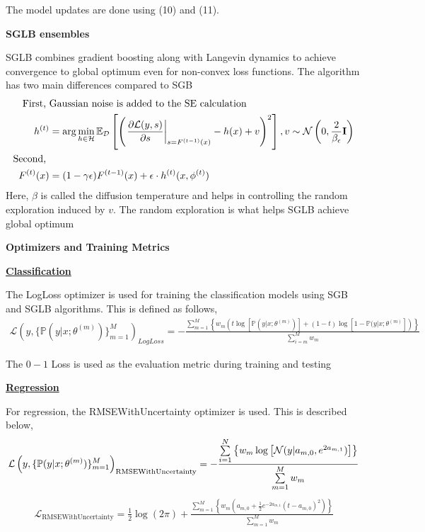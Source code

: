 \documentclass{article}
\begin{document}
The model updates are done using (10) and (11).

\textbf{SGLB ensembles}

SGLB combines gradient boosting along with Langevin dynamics \citet{raginsky} to achieve convergence to global optimum even for non-convex loss functions. The algorithm has two main differences compared to SGB \cite{sglb}
\begin{align}
	\text{First, } &\text{Gaussian noise is added to the SE calculation} \notag \\
	h^{(t)} &= \arg \min_{h \in \mathcal{H}} \mathbb{E}_{\mathcal{D}} \left[ \left( \left. \frac{\partial{\mathcal{L}(y,s)}}{\partial{s}} \right|_{s = F^{(t-1)}(x)} - h(x) + v \right)^2 \right], v \sim \mathcal{N}\left( 0, \frac{2}{\beta_{\epsilon}} \textbf{I}\right) \\
	\text{Second, } & \notag \\
	F^{(t)}(x) &= (1-\gamma\epsilon)F^{(t-1)}(x) + \epsilon \cdot h^{(t)}(x, \phi^{(t)})
\end{align}
Here, $\beta$ is called the diffusion temperature and helps in controlling the random exploration induced by $v$. The random exploration is what helps SGLB achieve global optimum

\textbf{Optimizers and Training Metrics}

\textbf{\underline{Classification}}

The LogLoss optimizer is used for training the classification models using SGB and SGLB algorithms. This is defined as follows,
\begin{align}
	\mathcal{L}\left(y,\{ \mathbb{P}(y|x; \theta^{(m)}) \}_{m=1}^M \right)_{LogLoss} = - \frac{\sum\limits_{m=1}^M \left\{ w_m\left(t\log\left[\mathbb{P}(y|x; \theta^{(m)})\right] + (1-t)\log\left[ 1 - \mathbb{P}(y|x; \theta^{(m)}\right]\right) \right\}}{\sum\limits_{i=m}^M w_m}
\end{align}

The $0-1$ Loss is used as the evaluation metric during training and testing

\textbf{\underline{Regression}}

For regression, the RMSEWithUncertainty optimizer is used. This is described below,
\begin{align}
	\mathcal{L}\left(y,\{ \mathbb{P}(y|x; \theta^{(m)}) \}_{m=1}^M \right)_{\text{RMSEWithUncertainty}} =-\frac{\sum\limits_{i=1}^N \left\{ w_m \log\left[ \mathcal{N}(y|a_{m,0},e^{2a_{m,1}}) \right] \right\}}{\sum\limits_{m=1}^M w_m} \notag
\end{align}
\begin{align}
	\mathcal{L}_{\text{RMSEWithUncertainty}} = \frac{1}{2}\log(2\pi) + \frac{\sum\limits_{m=1}^M \left\{ w_m\left(a_{m,0} + \frac{1}{2}e^{-2a_{m,1}}(t-a_{m,0})^2\right) \right\}}{\sum\limits_{m=1}^M w_m}
\end{align}
\end{document}
